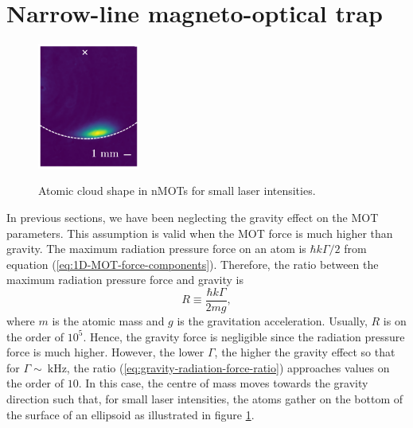 %
\newpage
\section{Narrow-line magneto-optical trap}
%

\begin{figure}
    \centering
    \vspace{-10px}
    \caption{Atomic cloud shape in nMOTs for small laser intensities.}
    \includegraphics[width=0.3\textwidth]{USPSC-img/atomic_cloud_shape_in_nMOTs.png}
    \label{fig:atomic-cloud-shape-nMOTs}
    \vspace{-10px}
\end{figure}

In previous sections, we have been neglecting the gravity effect on the MOT parameters. This assumption is valid when the MOT force is much higher than gravity. The maximum radiation pressure force on an atom is $ \hbar k \Gamma / 2 $ from equation (\ref{eq:1D-MOT-force-components}). Therefore, the ratio between the maximum radiation pressure force and gravity is
\begin{equation}
    R \equiv \frac{\hbar k \Gamma}{2 m g},
    \label{eq:gravity-radiation-force-ratio}
\end{equation}
where $ m $ is the atomic mass and $ g $ is the gravitation acceleration. Usually, $ R $ is on the order of $ 10^5 $. Hence, the gravity force is negligible since the radiation pressure force is much higher. However, the lower $ \Gamma $, the higher the gravity effect so that for $ \Gamma \sim\ \textrm{kHz} $, the ratio (\ref{eq:gravity-radiation-force-ratio}) approaches values on the order of $ 10 $. In this case, the centre of mass moves towards the gravity direction such that, for small laser intensities, the atoms gather on the bottom of the surface of an ellipsoid as illustrated in figure \ref{fig:atomic-cloud-shape-nMOTs}.

